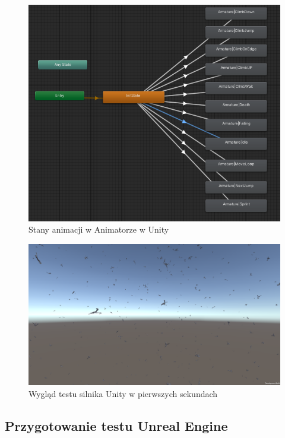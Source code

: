 \documentclass[12pt,twoside]{article}
\begin{document}
\begin{figure}[h]
    \centering
    \includegraphics[width=16cm]{figures/UnityAnimation.png}
    \caption{Stany animacji w Animatorze w Unity}
    \label{Fig:UnityAnimation}
\end{figure}     
\clearpage
\begin{figure}[H]
    \centering
    \includegraphics[width=16cm]{figures/UnityTestScreen.png}
    \caption{Wygląd testu silnika Unity w pierwszych sekundach }
    \label{Fig:TESTUnityScreen}
\end{figure}     

\subsection{Przygotowanie testu Unreal Engine}
\end{document}
